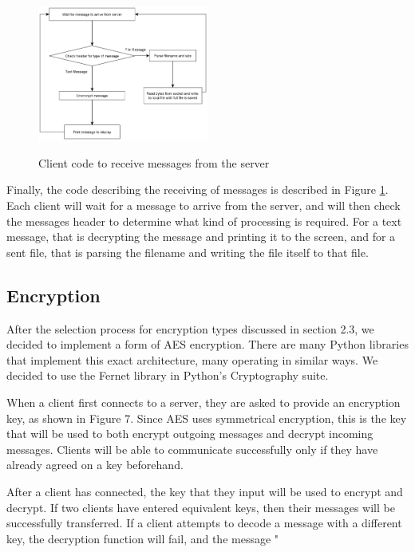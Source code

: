 \documentclass{article}
\begin{document}
\begin{figure}[h]
\caption{Client code to receive messages from the server}
\centering
\includegraphics[width=0.5\textwidth]{media/clientFlowchart3.png}
\label{client3}
\end{figure}

Finally, the code describing the receiving of messages is described in Figure \ref{client3}. Each client will wait for a message to arrive from the server, and will then check the messages header to determine what kind of processing is required. For a text message, that is decrypting the message and printing it to the screen, and for a sent file, that is parsing the filename and writing the file itself to that file.

\subsection{Encryption}

After the selection process for encryption types discussed in section 2.3, we decided to implement a form of AES encryption. There are many Python libraries that implement this exact architecture, many operating in similar ways. We decided to use the Fernet library in Python's Cryptography suite. 

When a client first connects to a server, they are asked to provide an encryption key, as shown in Figure 7. Since AES uses symmetrical encryption, this is the key that will be used to both encrypt outgoing messages and decrypt incoming messages. Clients will be able to communicate successfully only if they have already agreed on a key beforehand. 

After a client has connected, the key that they input will be used to encrypt and decrypt. If two clients have entered equivalent keys, then their messages will be successfully transferred. If a client attempts to decode a message with a different key, the decryption function will fail, and the message "
\end{document}

